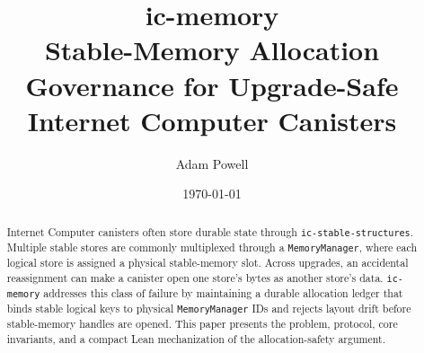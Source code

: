 \documentclass[11pt]{article}
\title{\textbf{ic-memory}\\
Stable-Memory Allocation Governance for Upgrade-Safe Internet Computer Canisters}
\author{Adam Powell}
\date{\today}
\begin{document}
\maketitle

\begin{abstract}
Internet Computer canisters often store durable state through
\texttt{ic-stable-structures}. Multiple stable stores are commonly multiplexed
through a \texttt{MemoryManager}, where each logical store is assigned a physical
stable-memory slot. Across upgrades, an accidental reassignment can make a
canister open one store's bytes as another store's data. \texttt{ic-memory}
addresses this class of failure by maintaining a durable allocation ledger that
binds stable logical keys to physical \texttt{MemoryManager} IDs and rejects
layout drift before stable-memory handles are opened. This paper presents the
problem, protocol, core invariants, and a compact Lean mechanization of the
allocation-safety argument.
\end{abstract}
\end{document}
